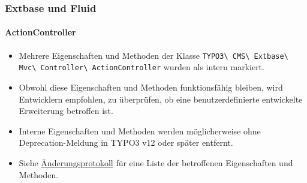 %

\begin{frame}[fragile]
	\frametitle{Extbase und Fluid}
	\framesubtitle{ActionController}

	\begin{itemize}
		\item Mehrere Eigenschaften und Methoden der Klasse
			\small\texttt{TYPO3\textbackslash
				CMS\textbackslash
				Extbase\textbackslash
				Mvc\textbackslash
				Controller\textbackslash
				ActionController}\normalsize\newline
			wurden als intern markiert.
		\item Obwohl diese Eigenschaften und Methoden funktionsfähig bleiben,
			wird Entwicklern empfohlen, zu überprüfen, ob eine benutzerdefinierte entwickelte Erweiterung betroffen ist.
		\item Interne Eigenschaften und Methoden werden möglicherweise ohne Deprecation-Meldung
			in TYPO3 v12 oder später entfernt.
		\item Siehe \href{https://docs.typo3.org/c/typo3/cms-core/master/en-us/Changelog/11.0/Important-92996-PropertiesAndMethodsInActionControllerMarkedInternal.html}{Änderungsprotokoll}
			für eine Liste der betroffenen Eigenschaften und Methoden.
	\end{itemize}

\end{frame}


